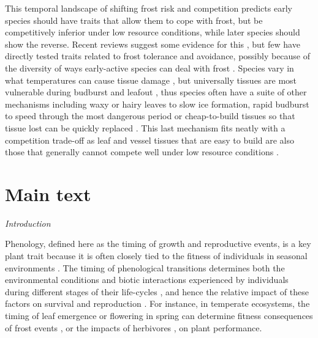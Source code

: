 \documentclass[11pt]{article}
\begin{document}
This temporal landscape of shifting frost risk and competition predicts early species should have traits that allow them to cope with frost, but be competitively inferior under low resource conditions, while later species should show the reverse. Recent reviews suggest some evidence for this \citep{wolkovich2014aob,memegan2021}, but few have directly tested traits related to frost tolerance and avoidance, possibly because of the diversity of ways early-active species can deal with frost \citep{frostbook}. Species vary in what temperatures can cause tissue damage \citep{Lenz2013}, but universally tissues are most vulnerable during budburst and leafout \citep{frostbook,vitasse2014earlier,cat2019}, thus species often have a suite of other mechanisms including waxy or hairy leaves to slow ice formation, rapid budburst to speed through the most dangerous period or cheap-to-build tissues so that tissue lost can be quickly replaced \citep{frostbook}. This last mechanism fits neatly with a competition trade-off as leaf and vessel tissues that are easy to build are also those that generally cannot compete well under low resource conditions \citep{larcher1980,diaz2016global}. 

\section{Main text}

\emph{Introduction} 

Phenology, defined here as the timing of growth and reproductive events, is a key plant trait because it is often closely tied to the fitness of individuals in seasonal environments \citep{verdu2005early,munguia2011meta}. The timing of phenological transitions determines both the environmental conditions and biotic interactions experienced by individuals during different stages of their life-cycles \citep{donohue2005niche}, and hence the relative impact of these factors on survival and reproduction \citep{caruso2019meta}. For instance, in temperate ecosystems, the timing of leaf emergence or flowering in spring can determine fitness consequences of frost events \citep{inouye2008effects,augspurger2013reconstructing}, or the impacts of herbivores \citep{meineke2021phenological}, on plant performance.
\end{document}
